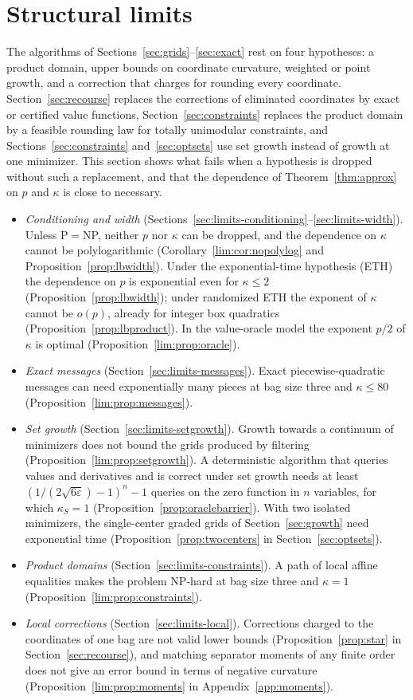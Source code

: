 \section{Structural limits}\label{sec:limits}

The algorithms of Sections~\ref{sec:grids}--\ref{sec:exact} rest on four
hypotheses: a product domain, upper bounds on coordinate curvature, weighted
or point growth, and a correction that charges for rounding every coordinate.
Section~\ref{sec:recourse} replaces the corrections of eliminated coordinates
by exact or certified value functions, Section~\ref{sec:constraints} replaces
the product domain by a feasible rounding law for totally unimodular
constraints, and Sections~\ref{sec:constraints} and~\ref{sec:optsets} use set
growth instead of growth at one minimizer. This section shows what fails when a
hypothesis is dropped without such a replacement, and that the dependence of
Theorem~\ref{thm:approx} on $p$ and $\kappa$ is close to necessary.
\begin{itemize}
\item \emph{Conditioning and width}
(Sections~\ref{sec:limits-conditioning}--\ref{sec:limits-width}). Unless
P${}={}$NP, neither $p$ nor $\kappa$ can be dropped, and the dependence on
$\kappa$ cannot be polylogarithmic (Corollary~\ref{lim:cor:nopolylog} and
Proposition~\ref{prop:lbwidth}). Under the exponential-time hypothesis (ETH)
the dependence on $p$ is exponential even for $\kappa\le2$
(Proposition~\ref{prop:lbwidth}); under randomized ETH the exponent of
$\kappa$ cannot be $o(p)$, already for integer box quadratics
(Proposition~\ref{prop:lbproduct}). In the value-oracle model the exponent
$p/2$ of $\kappa$ is optimal (Proposition~\ref{lim:prop:oracle}).
\item \emph{Exact messages} (Section~\ref{sec:limits-messages}). Exact
piecewise-quadratic messages can need exponentially many pieces at bag size
three and $\kappa\le80$ (Proposition~\ref{lim:prop:messages}).
\item \emph{Set growth} (Section~\ref{sec:limits-setgrowth}). Growth towards a
continuum of minimizers does not bound the grids produced by filtering
(Proposition~\ref{lim:prop:setgrowth}). A deterministic algorithm that
queries values and derivatives and is correct under set growth needs at least
$(1/(2\sqrt{6\varepsilon})-1)^n-1$ queries on the zero function in $n$
variables, for which $\kappa_S=1$ (Proposition~\ref{prop:oraclebarrier}).
With two isolated minimizers, the single-center graded grids of
Section~\ref{sec:growth} need exponential time
(Proposition~\ref{prop:twocenters} in Section~\ref{sec:optsets}).
\item \emph{Product domains} (Section~\ref{sec:limits-constraints}). A path of
local affine equalities makes the problem NP-hard at bag size three and
$\kappa=1$ (Proposition~\ref{lim:prop:constraints}).
\item \emph{Local corrections} (Section~\ref{sec:limits-local}). Corrections
charged to the coordinates of one bag are not valid lower bounds
(Proposition~\ref{prop:star} in Section~\ref{sec:recourse}), and matching
separator moments of any finite order does not give an error bound in terms
of negative curvature (Proposition~\ref{lim:prop:moments} in
Appendix~\ref{app:moments}).
\end{itemize}
